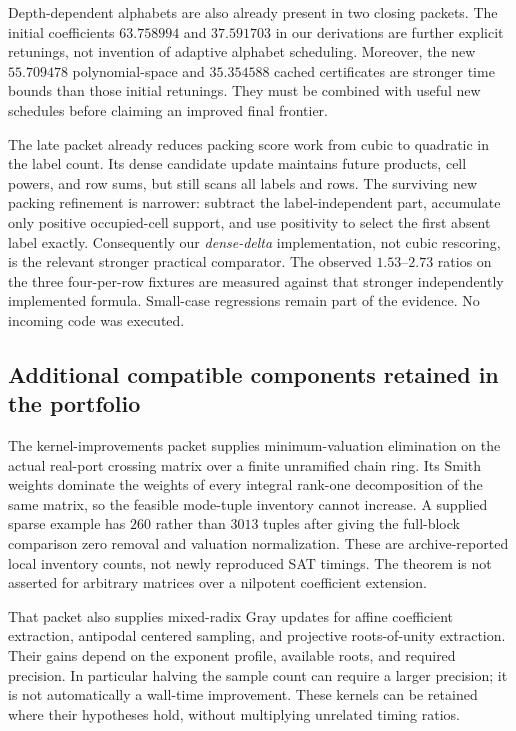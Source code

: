 \documentclass[11pt,letterpaper]{article}
\theoremstyle{remark}\newtheorem{remark}[theorem]{Remark}
\begin{document}
Depth-dependent alphabets are also already present in two closing packets.
The initial coefficients $63.758994$ and $37.591703$ in our derivations are
further explicit retunings, not invention of adaptive alphabet scheduling.
Moreover, the new $55.709478$ polynomial-space and $35.354588$ cached
certificates are stronger time bounds than those initial retunings. They must
be combined with useful new schedules before claiming an improved final frontier.

The late  packet already reduces packing
score work from cubic to quadratic in the label count. Its dense candidate
update maintains future products, cell powers, and row sums, but still scans
all labels and rows. The surviving new packing refinement is narrower: subtract
the label-independent part, accumulate only positive occupied-cell support, and
use positivity to select the first absent label exactly. Consequently our
\emph{dense-delta} implementation, not cubic rescoring, is the relevant stronger
practical comparator. The observed $1.53$--$2.73$ ratios on the three four-per-row
fixtures are measured against that stronger independently implemented formula.
Small-case regressions remain part of the evidence. No incoming code was executed.

\subsection{Additional compatible components retained in the portfolio}
The kernel-improvements packet supplies minimum-valuation elimination on the
actual real-port crossing matrix over a finite unramified chain ring. Its Smith
weights dominate the weights of every integral rank-one decomposition of the
same matrix, so the feasible mode-tuple inventory cannot increase. A supplied
sparse example has $260$ rather than $3013$ tuples after giving the full-block
comparison zero removal and valuation normalization. These are archive-reported
local inventory counts, not newly reproduced SAT timings. The theorem is not
asserted for arbitrary matrices over a nilpotent coefficient extension.

That packet also supplies mixed-radix Gray updates for affine coefficient
extraction, antipodal centered sampling, and projective roots-of-unity extraction.
Their gains depend on the exponent profile, available roots, and required
precision. In particular halving the sample count can require a larger precision;
it is not automatically a wall-time improvement. These kernels can be retained
where their hypotheses hold, without multiplying unrelated timing ratios.
\end{document}
